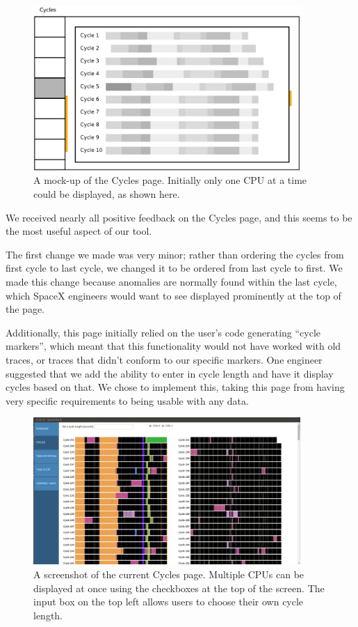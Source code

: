 \documentclass{hmcclinic}
\begin{document}
\begin{figure}[H]
\begin{center}
\includegraphics[width=4in]{oldcycles.png}
\caption{A mock-up of the Cycles page. Initially only one CPU at a time could be
displayed, as shown here.}
\end{center}
\end{figure}

We received nearly all positive feedback on the Cycles page, and this seems to
be the most useful aspect of our tool.

The first change  we made was very minor; rather than ordering the cycles from first cycle to last cycle, we changed it to be ordered from last cycle to first. We made this change because anomalies are normally found within the last cycle, which SpaceX engineers would want to see displayed prominently at the top of the page.

Additionally, this page initially relied on the user's code generating ``cycle
markers'', which meant that this functionality would not have worked with old
traces, or traces that didn't conform to our specific markers. One engineer
suggested that we add the ability to enter in cycle length and have it display
cycles based on that. We chose to implement this, taking this page from having
very specific requirements to being usable with any data.

\begin{figure}[H]
\begin{center}
\includegraphics[width=4in]{cycles-page.png}
\caption{A screenshot of the current Cycles page. Multiple CPUs can be displayed
at once using the checkboxes at the top of the screen. The input box on the top
left allows users to choose their own cycle length.}
\end{center}
\end{figure}
\end{document}

